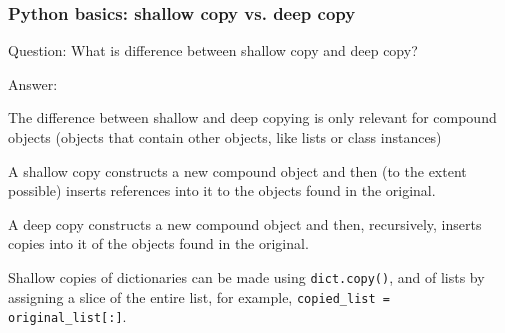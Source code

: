 \documentclass[11pt]{beamer}
\begin{document}
\begin{frame}
\frametitle{Python basics: shallow copy vs. deep copy}
\begin{block}{Question:}
	What is difference between shallow copy and deep copy?
\end{block}
\begin{block}{Answer:}
	
	The difference between shallow and deep copying is only relevant for compound objects (objects that contain other objects, like lists or class instances)
	
	A shallow copy constructs a new compound object and then (to the extent possible) inserts references into it to the objects found in the original.
	
	A deep copy constructs a new compound object and then, recursively, inserts copies into it of the objects found in the original.
	
	Shallow copies of dictionaries can be made using \texttt{dict.copy()}, and of lists by assigning a slice of the entire list, for example, \texttt{copied\_list = original\_list[:]}.
\end{block}
\end{frame}
\end{document}
